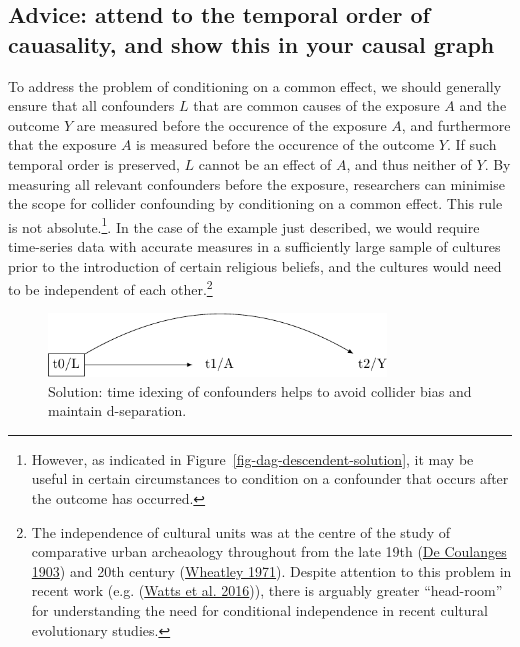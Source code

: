 \documentclass[
  singlecolumn]{report}
\begin{document}
\hypertarget{advice-attend-to-the-temporal-order-of-cauasality-and-show-this-in-your-causal-graph}{%
\subsection{Advice: attend to the temporal order of cauasality, and show
this in your causal
graph}\label{advice-attend-to-the-temporal-order-of-cauasality-and-show-this-in-your-causal-graph}}

To address the problem of conditioning on a common effect, we should
generally ensure that all confounders \(L\) that are common causes of
the exposure \(A\) and the outcome \(Y\) are measured before the
occurence of the exposure \(A\), and furthermore that the exposure \(A\)
is measured before the occurence of the outcome \(Y\). If such temporal
order is preserved, \(L\) cannot be an effect of \(A\), and thus neither
of \(Y\). By measuring all relevant confounders before the exposure,
researchers can minimise the scope for collider confounding by
conditioning on a common effect. This rule is not absolute.\footnote{However,
  as indicated in Figure~\ref{fig-dag-descendent-solution}, it may be
  useful in certain circumstances to condition on a confounder that
  occurs after the outcome has occurred.}. In the case of the example
just described, we would require time-series data with accurate measures
in a sufficiently large sample of cultures prior to the introduction of
certain religious beliefs, and the cultures would need to be independent
of each other.\footnote{The independence of cultural units was at the
  centre of the study of comparative urban archeaology throughout from
  the late 19th (\protect\hyperlink{ref-decoulanges1903}{De Coulanges
  1903}) and 20th century (\protect\hyperlink{ref-wheatley1971}{Wheatley
  1971}). Despite attention to this problem in recent work (e.g.
  (\protect\hyperlink{ref-watts2016}{Watts et al. 2016})), there is
  arguably greater ``head-room'' for understanding the need for
  conditional independence in recent cultural evolutionary studies.}

\begin{figure}

{\centering \includegraphics[width=0.8\textwidth,height=\textheight]{causal-dags_files/figure-pdf/fig-dag-common-effect-solution-1.pdf}

}

\caption{\label{fig-dag-common-effect-solution}Solution: time idexing of
confounders helps to avoid collider bias and maintain d-separation.}

\end{figure}
\end{document}

